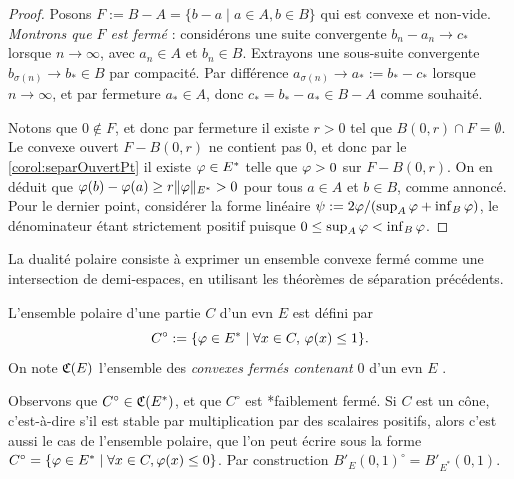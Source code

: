 \begin{proof}
	Posons $F := B-A = \{b-a \mid a\in A, b \in B\}$ qui est convexe et non-vide. \emph{Montrons que $F$ est fermé} : considérons une suite convergente $b_n-a_n \to c_*$ lorsque $n \to \infty$, avec $a_n \in A$ et $b_n\in B$. Extrayons une sous-suite convergente $b_{\sigma(n)} \to b_*\in B$ par compacité. Par différence $a_{\sigma(n)} \to a_* := b_* - c_*$  lorsque $n \to \infty$, et par fermeture $a_* \in A$, donc $c_* = b_*-a_* \in B-A$ comme souhaité. 
	
	Notons que $0 \notin F$, et donc par fermeture il existe $r>0$ tel que $B(0,r) \cap F =\emptyset$. Le convexe ouvert $F-B(0,r)$ ne contient pas $0$, et donc par le \cref{corol:separOuvertPt} il existe $\varphi \in E^*$ telle que $\varphi>0$ sur $F-B(0,r)$. On en déduit que $\varphi(b)-\varphi(a) \geq r\|\varphi\|_{E^*} > 0$ pour tous $a\in A$ et $b \in B$, comme annoncé.
	Pour le dernier point, considérer la forme linéaire $\psi := 2\varphi/(\sup_A \varphi+\inf_B\varphi)$, le dénominateur étant strictement positif puisque $0 \leq \sup_A \varphi < \inf_B \varphi$.
\end{proof}





La dualité polaire consiste à exprimer un ensemble convexe fermé comme une intersection de demi-espaces, en utilisant les théorèmes de séparation précédents.

\begin{definition}
\label{def:convexePolaire}
%
L'ensemble polaire d'une partie $C$ d'un evn $E$ est défini par 
	\begin{equation*}
		C^\circ := \{\varphi \in E^* \mid \forall x \in C,\, \varphi(x) \leq 1\}.
	\end{equation*}
	On note $\mathfrak{C}(E)$ l'ensemble des \emph{convexes fermés contenant $0$} d'un evn $E$ .
\end{definition}
Observons que $C^\circ \in \mathfrak{C}(E^*)$, et que $C^\circ$ est *faiblement fermé.
Si $C$ est un cône, c'est-à-dire s'il est stable par multiplication par des scalaires positifs, alors c'est aussi le cas de l'ensemble polaire, que l'on peut écrire sous la forme $C^\circ = \{\varphi \in E^*\mid \forall x \in C, \varphi(x) \leq 0\}$.
Par construction $B'_E(0,1)^\circ = B'_{E^*}(0,1)$. 

